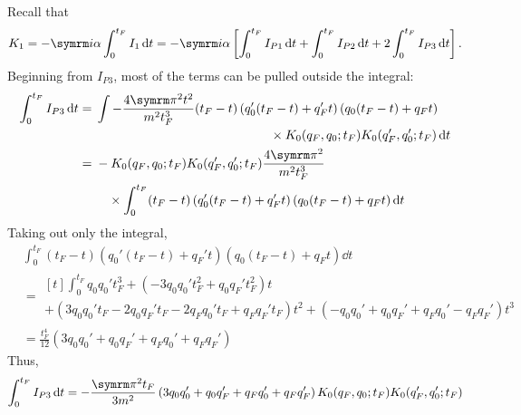 Recall that
\begin{equation}
    K_1 = -\im\alpha\int_0^{t_F} I_1\dd{t} = -\im\alpha\left[\int_0^{t_F} I_{P1}\dd{t} + \int_0^{t_F} I_{P2}\dd{t} + 2\int_0^{t_F} I_{P3}\dd{t}\right]. \label{eq:spring_K1def}
\end{equation}
Beginning from $I_{P3}$, most of the terms can be pulled outside the integral:
\begin{align}
    \int_0^{t_F}I_{P3}\dd{t} &= \begin{multlined}[t]
        \int -\frac{4\cpi^2t^2}{m^2t_F^3}(t_F - t)\left(q_0'(t_F - t) + q_F't\right)\left(q_0(t_F - t) + q_Ft\right) \\ \times K_0(q_F, q_0; t_F)K_0(q_F', q_0'; t_F)\dd{t}
    \end{multlined} \\
    &= \begin{multlined}[t]
        -K_0(q_F, q_0; t_F)K_0(q_F', q_0'; t_F)\frac{4\cpi^2}{m^2t_F^3} \\ \times\int_0^{t_F}(t_F - t)\left(q_0'(t_F - t) + q_F't\right)\left(q_0(t_F - t) + q_Ft\right)\dd{t}
    \end{multlined}
\end{align}
Taking out only the integral,
\begin{align}
    &\int_0^{t_F}(t_F - t)\left(q_0'(t_F - t) + q_F't\right)\left(q_0(t_F - t) + q_Ft\right)\dd{t} \\
    &= \begin{multlined}[t]
        \int_0^{t_F} q_0q_0't_F^3 + (-3q_0q_0't_F^2 + q_0q_F't_F^2)t \\+ (3q_0q_0't_F - 2q_0q_F't_F - 2q_Fq_0't_F + q_Fq_F't_F)t^2 + (-q_0q_0' + q_0q_F' + q_Fq_0' - q_Fq_F')t^3
    \end{multlined} \\
    &= \frac{t_{F}^{4}}{12}\left(3q_0q_0' + q_0q_F' + q_Fq_0' + q_Fq_F'\right)
\end{align}
Thus,
\begin{equation}
    \int_0^{t_F}I_{P3}\dd{t} = -\frac{\cpi^2t_F}{3m^2}\left(3q_0q_0' + q_0q_F' + q_Fq_0' + q_Fq_F'\right)K_0(q_F, q_0; t_F)K_0(q_F', q_0'; t_F)
\end{equation}

